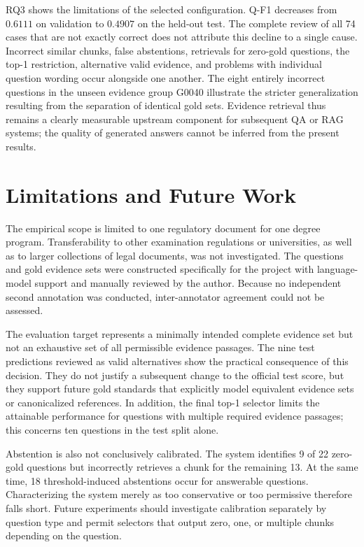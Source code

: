 \documentclass[11pt]{article}
\begin{document}
RQ3 shows the limitations of the selected configuration. Q-F1 decreases from $0.6111$ on validation to $0.4907$ on the held-out test. The complete review of all 74 cases that are not exactly correct does not attribute this decline to a single cause. Incorrect similar chunks, false abstentions, retrievals for zero-gold questions, the top-1 restriction, alternative valid evidence, and problems with individual question wording occur alongside one another. The eight entirely incorrect questions in the unseen evidence group G0040 illustrate the stricter generalization resulting from the separation of identical gold sets. Evidence retrieval thus remains a clearly measurable upstream component for subsequent QA or RAG systems; the quality of generated answers cannot be inferred from the present results.


\section{Limitations and Future Work}

The empirical scope is limited to one regulatory document for one degree program. Transferability to other examination regulations or universities, as well as to larger collections of legal documents, was not investigated. The questions and gold evidence sets were constructed specifically for the project with language-model support and manually reviewed by the author. Because no independent second annotation was conducted, inter-annotator agreement could not be assessed.

The evaluation target represents a minimally intended complete evidence set but not an exhaustive set of all permissible evidence passages. The nine test predictions reviewed as valid alternatives show the practical consequence of this decision. They do not justify a subsequent change to the official test score, but they support future gold standards that explicitly model equivalent evidence sets or canonicalized references. In addition, the final top-1 selector limits the attainable performance for questions with multiple required evidence passages; this concerns ten questions in the test split alone.

Abstention is also not conclusively calibrated. The system identifies 9 of 22 zero-gold questions but incorrectly retrieves a chunk for the remaining 13. At the same time, 18 threshold-induced abstentions occur for answerable questions. Characterizing the system merely as too conservative or too permissive therefore falls short. Future experiments should investigate calibration separately by question type and permit selectors that output zero, one, or multiple chunks depending on the question.
\end{document}
